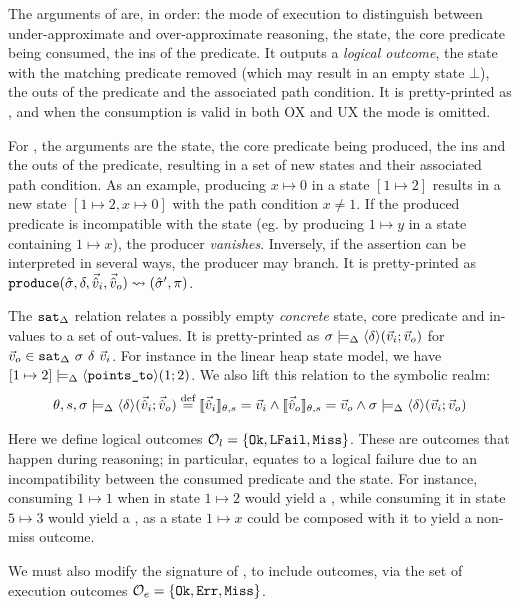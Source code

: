 The arguments of \consume{} are, in order: the mode of execution to distinguish between under-approximate and over-approximate reasoning, the state, the core predicate being consumed, the ins of the predicate. It outputs a \emph{logical outcome}, the state with the matching predicate removed (which may result in an empty state $\bot$), the outs of the predicate and the associated path condition. It is pretty-printed as , and when the consumption is valid in both OX and UX the mode is omitted.

For \produce{}, the arguments are the state, the core predicate being produced, the ins and the outs of the predicate, resulting in a set of new states and their associated path condition. As an example, producing $x \mapsto 0$ in a state $[1 \mapsto 2]$ results in a new state $[1\mapsto 2, x \mapsto 0]$ with the path condition $x \neq 1$. If the produced predicate is incompatible with the state (eg. by producing $1 \mapsto y$ in a state containing $1 \mapsto x$), the producer \emph{vanishes}. Inversely, if the assertion can be interpreted in several ways, the producer may branch. It is pretty-printed as $\texttt{produce}(\hat{\sigma},\delta,\vec{\hat{v}}_i,\vec{\hat{v}}_o)\rightsquigarrow (\hat{\sigma}', \pi)$.

The $\texttt{sat}_\Delta$ relation relates a possibly empty \emph{concrete} state, core predicate and in-values to a set of out-values. It is pretty-printed as $\sigma \models_{\Delta} \left<\delta\right>\!(\vec{v}_i;\vec{v}_o)$ for $\vec{v}_o \in \texttt{sat}_\Delta~\sigma~\delta~\vec{v}_i$. For instance in the linear heap state model, we have $[ 1 \mapsto 2 ] \models_{\Delta} \left<\texttt{points\_to}\right>\!(1;2)$. We also lift this relation to the symbolic realm: 
\begin{align*}
	\theta,s,\sigma\models_{\Delta} \left<\delta\right>\!(\vec{\hat{v}}_i;\vec{\hat{v}}_o) \stackrel{\textnormal{def}}= \llbracket\vec{\hat{v}}_i\rrbracket_{\theta,s}=\vec{v}_i \land \llbracket\vec{\hat{v}}_o\rrbracket_{\theta,s}=\vec{v}_o \land \sigma\models_{\Delta} \left<\delta\right>\!(\vec{v}_i;\vec{v}_o)
\end{align*}

Here we define logical outcomes ${\cal O}_l = \{\texttt{Ok}, \texttt{LFail}, \texttt{Miss} \}$. These are outcomes that happen during reasoning; in particular, \LFail{} equates to a logical failure due to an incompatibility between the consumed predicate and the state. For instance, consuming $1 \mapsto 1$ when in state $1 \mapsto 2$ would yield a \LFail{}, while consuming it in state $5 \mapsto 3$ would yield a \Miss{}, as a state $1\mapsto x$ could be composed with it to yield a non-miss outcome.

We must also modify the signature of \execac, to include \Miss{} outcomes, via the set of execution outcomes ${\cal O}_e=\{\texttt{Ok},\texttt{Err},\texttt{Miss}\}$.

